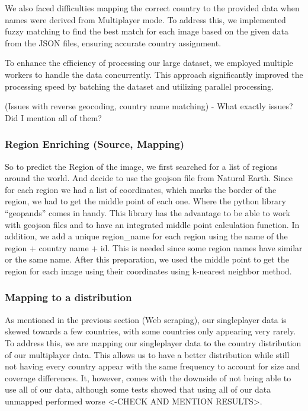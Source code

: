 We also faced difficulties mapping the correct country to the provided
data when names were derived from Multiplayer mode. To address this, we
implemented fuzzy matching to find the best match for each image based
on the given data from the JSON files, ensuring accurate country
assignment.

To enhance the efficiency of processing our large dataset, we employed
multiple workers to handle the data concurrently. This approach
significantly improved the processing speed by batching the dataset and
utilizing parallel processing.

(Issues with reverse geocoding, country name matching) - What exactly
issues? Did I mention all of them?

\subsubsection{Region Enriching (Source,
Mapping)}\label{region-enriching-source-mapping}

So to predict the Region of the image, we first searched for a list of
regions around the world. And decide to use the geojson file from
Natural Earth. Since for each region we had a list of coordinates, which
marks the border of the region, we had to get the middle point of each
one. Where the python library ``geopands'' comes in handy. This library
has the advantage to be able to work with geojson files and to have an
integrated middle point calculation function. In addition, we add a
unique region\_name for each region using the name of the region +
country name + id. This is needed since some region names have similar
or the same name. After this preparation, we used the middle point to
get the region for each image using their coordinates using k-nearest
neighbor method.

\subsubsection{Mapping to a
distribution}\label{mapping-to-a-distribution}

As mentioned in the previous section (Web scraping), our singleplayer
data is skewed towards a few countries, with some countries only
appearing very rarely. To address this, we are mapping our singleplayer
data to the country distribution of our multiplayer data. This allows us
to have a better distribution while still not having every country
appear with the same frequency to account for size and coverage
differences. It, however, comes with the downside of not being able to
use all of our data, although some tests showed that using all of our
data unmapped performed worse \textless-CHECK AND MENTION
RESULTS\textgreater.

